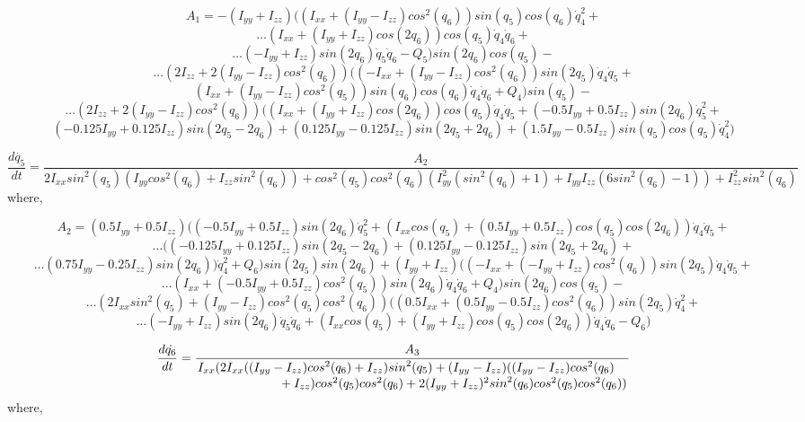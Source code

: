 \documentclass[10pt, letterpaper]{article}
\begin{document}
\[
A_{1} = -(I_{yy} + I_{zz})((I_{xx} + (I_{yy} - I_{zz}) {cos}^{2}(q_{6})) {sin}(q_{5}) {cos}(q_{6}) \dot{q}_{4}^{2} +
\]
\[
\ldots(I_{xx} + (I_{yy} + I_{zz}) {cos}(2 q_{6})) {cos}(q_{5}) \dot{q}_{4} \dot{q}_{6} +
\]
\[ 
\ldots(- I_{yy} + I_{zz}) {sin}(2 q_{6}) \dot{q}_{5} \dot{q}_{6} - Q_{5}){sin}(2 q_{6}) {cos}(q_{5}) -
\]
\[ 
\ldots(2 I_{zz} + 2 (I_{yy} - I_{zz}) {cos}^{2}(q_{6}))((- I_{xx} + (I_{yy} - I_{zz}) {cos}^{2}(q_{6})) {sin}(2 q_{5}) \dot{q}_{4} \dot{q}_{5} + 
\]
\[
(I_{xx} + (I_{yy} - I_{zz}) {cos}^{2}(q_{5})) {sin}(q_{6}) {cos}(q_{6}) \dot{q}_{4} \dot{q}_{6} + Q_{4}) {sin}(q_{5}) -
\]
\[ 
\ldots(2 I_{zz} + 2 (I_{yy} - I_{zz}) {cos}^{2}(q_{6})) ((I_{xx} + (I_{yy} + I_{zz}) {cos}(2 q_{6})) {cos}(q_{5}) \dot{q}_{4} \dot{q}_{5} + (- 0.5 I_{yy} + 0.5 I_{zz}) {sin}(2 q_{6}) \dot{q}_{5}^{2} + 
\]
\[
(- 0.125 I_{yy} + 0.125 I_{zz}) {sin}(2 q_{5} - 2 q_{6}) + (0.125 I_{yy} - 0.125 I_{zz}) {sin}(2 q_{5} + 2 q_{6}) + (1.5 I_{yy} - 0.5 I_{zz}) {sin}(q_{5}) {cos}(q_{5}) \dot{q}_{4}^{2})
\]

\[
\frac{d\dot{q_{5}}}{dt} = \frac{A_{2}}
{2I_{xx}{sin}^2(q_{5})(I_{yy}{cos}^2(q_{6})+I_{zz}{sin}^2(q_{6}))+{cos}^2(q_{5}){cos}^2(q_{6})(I_{yy}^2({sin}^2(q_{6})+1)+I_{yy}I_{zz}(6 {sin}^2(q_{6})-1))+I_{zz}^2{sin}^2(q_{6})}
\]
where,

\[A_{2} =(0.5 I_{yy} + 0.5 I_{zz}) ((- 0.5 I_{yy} + 0.5 I_{zz}) {sin}(2 q_{6}) \dot{q}_{5}^{2} + (I_{xx} {cos}(q_{5}) + (0.5 I_{yy} + 0.5 I_{zz}) {cos}(q_{5}) {cos}(2 q_{6})) \dot{q}_{4} \dot{q}_{5} +
\]
\[
\ldots((- 0.125 I_{yy} + 0.125 I_{zz}) {sin}(2 q_{5} - 2 q_{6}) + (0.125 I_{yy} - 0.125 I_{zz}) {sin}(2 q_{5} + 2 q_{6}) +
\]
\[
\ldots(0.75 I_{yy} - 0.25 I_{zz}) {sin}(2 q_{6})) \dot{q}_{4}^{2} + Q_{6}) {sin}(2 q_{5}) {sin}(2 q_{6}) + (I_{yy} + I_{zz}) ((- I_{xx} + (- I_{yy} + I_{zz}) {cos}^{2}(q_{6})) {sin}(2 q_{5}) \dot{q}_{4} \dot{q}_{5} +
\]
\[
\ldots(I_{xx} + (- 0.5 I_{yy} + 0.5 I_{zz}) {cos}^{2}(q_{5})) {sin}(2 q_{6}) \dot{q}_{4} \dot{q}_{6} + Q_{4}) {sin}(2 q_{6}) {cos}(q_{5}) -
\]
\[
\ldots(2 I_{xx} {sin}^{2}(q_{5}) + (I_{yy} - I_{zz}) {cos}^{2}(q_{5}) {cos}^{2}(q_{6})) ((0.5 I_{xx} + (0.5 I_{yy} - 0.5 I_{zz}) {cos}^{2}(q_{6})) {sin}(2 q_{5}) \dot{q}_{4}^{2} +
\]
\[
\ldots(- I_{yy} + I_{zz}) {sin}(2 q_{6}) \dot{q}_{5} \dot{q}_{6} + (I_{xx} {cos}(q_{5}) + (I_{yy} + I_{zz}) {cos}(q_{5}) {cos}(2 q_{6})) \dot{q}_{4} \dot{q}_{6} - Q_{6})
\]

\[
\frac{d\dot{q_{6}}}{dt} =
\frac{A_{3}}
{\splitfrac{I_{xx}( 2 I_{xx} ((I_{yy}-I_{zz}) {cos}^{2}(q_{6}) + I_{zz}) {sin}^{2}(q_{5}) + 
(I_{yy} - I_{zz}) ((I_{yy}-I_{zz}) {cos}^{2}(q_{6})}
{ + I_{zz}) {cos}^{2}(q_{5}) {cos}^{2}(q_{6}) + 2 (I_{yy} + I_{zz})^{2} {sin}^{2}(q_{6}) {cos}^{2}(q_{5}) {cos}^{2}(q_{6}))}}
\]
where,
\end{document}
